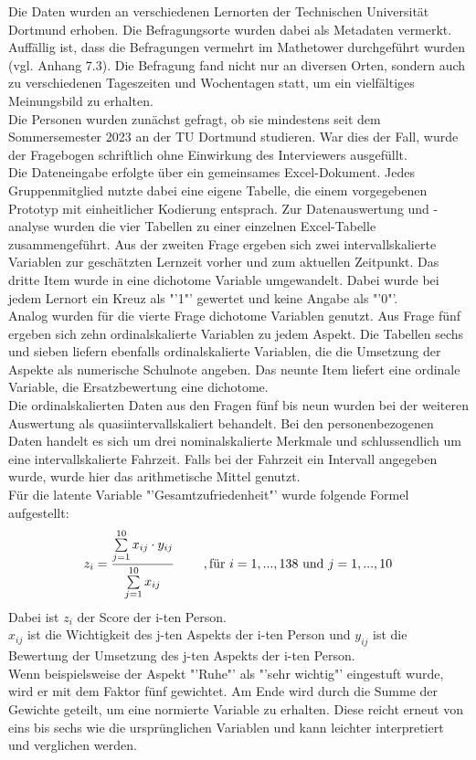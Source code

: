 \documentclass[11pt, a4paper]{article}
\begin{document}
\vspace{-0.15cm}
Die Daten wurden an verschiedenen Lernorten der Technischen Universität Dortmund erhoben. Die Befragungsorte wurden dabei als Metadaten vermerkt. Auffällig ist, dass die Befragungen vermehrt im Mathetower durchgeführt wurden (vgl. Anhang 7.3). Die Befragung fand nicht nur an diversen Orten, sondern auch zu verschiedenen Tageszeiten und Wochentagen statt, um ein vielfältiges Meinungsbild zu erhalten.\\
Die Personen wurden zunächst gefragt, ob sie mindestens seit dem Sommersemester 2023 an der TU Dortmund studieren. War dies der Fall, wurde der Fragebogen schriftlich ohne Einwirkung des Interviewers ausgefüllt.\\
Die Dateneingabe erfolgte über ein gemeinsames Excel-Dokument. Jedes Gruppenmitglied nutzte dabei eine eigene Tabelle, die einem vorgegebenen Prototyp mit einheitlicher Kodierung entsprach. Zur Datenauswertung und -analyse wurden die vier Tabellen zu einer einzelnen Excel-Tabelle zusammengeführt. Aus der zweiten Frage ergeben sich zwei intervallskalierte Variablen zur geschätzten Lernzeit vorher und zum aktuellen Zeitpunkt. Das dritte Item wurde in eine dichotome Variable umgewandelt. Dabei wurde bei jedem Lernort ein Kreuz als "'1"' gewertet und keine Angabe als "'0"'. \\
Analog wurden für die vierte Frage dichotome Variablen genutzt. Aus Frage fünf ergeben sich zehn ordinalskalierte Variablen zu jedem Aspekt. Die Tabellen sechs und sieben liefern ebenfalls ordinalskalierte Variablen, die die Umsetzung der Aspekte als numerische Schulnote angeben. Das neunte Item liefert eine ordinale Variable, die Ersatzbewertung eine dichotome.\\
Die ordinalskalierten Daten aus den Fragen fünf bis neun wurden bei der weiteren Auswertung als quasiintervallskaliert behandelt. Bei den personenbezogenen Daten handelt es sich um drei nominalskalierte Merkmale und schlussendlich um eine intervallskalierte Fahrzeit. Falls bei der Fahrzeit ein Intervall angegeben wurde, wurde hier das arithmetische Mittel genutzt. \\

\vspace{-0.1cm}
Für die latente Variable "'Gesamtzufriedenheit"' wurde folgende Formel aufgestellt:
\begin{equation*}
	z_i = \frac{\sum\limits_{j=1}^{10}x_{ij}\cdot  y_{ij}}{\sum\limits_{j=1}^{10}x_{ij}} \hspace{0.8cm} , \text{für} \ 
	i=1,...,138\  \text{und} \ j=1,...,10
	\vspace{0.15cm}
\end{equation*} 
Dabei ist $z_i$ der Score der i-ten Person. \\
$x_{ij}$ ist die Wichtigkeit des j-ten Aspekts der i-ten Person und
$y_{ij}$ ist die Bewertung der Umsetzung des j-ten Aspekts der i-ten Person.\\
 Wenn beispielsweise der Aspekt "'Ruhe"' als "'sehr wichtig"' eingestuft wurde, wird er mit dem Faktor fünf gewichtet. Am Ende wird durch die Summe der Gewichte geteilt, um eine normierte Variable zu erhalten.  Diese reicht erneut von eins bis sechs wie die ursprünglichen Variablen und kann leichter interpretiert und verglichen werden.
\end{document}
